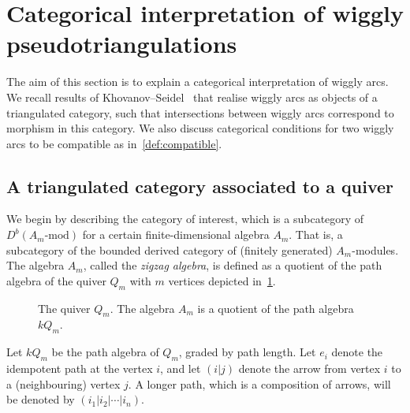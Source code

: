 \documentclass{amsart}
\theoremstyle{definition}
\begin{document}
\section{Categorical interpretation of wiggly pseudotriangulations}
The aim of this section is to explain a categorical interpretation of wiggly arcs.
We recall results of Khovanov--Seidel~\cite{kho.sei:02} that realise wiggly arcs as objects of a triangulated category, such that intersections between wiggly arcs correspond to morphism in this category.
We also discuss categorical conditions for two wiggly arcs to be compatible as in~\cref{def:compatible}.


\subsection{A triangulated category associated to a quiver}
We begin by describing the category of interest, which is a subcategory of \(D^b(A_m\text{-mod})\) for a certain finite-dimensional algebra \(A_m\).
That is, a subcategory of the bounded derived category of (finitely generated) \(A_m\)-modules.
The algebra \(A_m\), called the \emph{zigzag algebra}, is defined as a quotient of the path algebra of the quiver \(Q_m\) with \(m\) vertices depicted in~\cref{fig:am-quiver}.
\begin{figure}[h]
  \centering
  \caption{The quiver \(Q_m\). The algebra \(A_m\) is a quotient of the path algebra \(kQ_m\).}
  \label{fig:am-quiver}
\end{figure}
Let \(kQ_m\) be the path algebra of \(Q_m\), graded by path length.
Let \(e_i\) denote the idempotent path at the vertex \(i\), and let \((i|j)\) denote the arrow from vertex \(i\) to a (neighbouring) vertex \(j\).
A longer path, which is a composition of arrows, will be denoted by \((i_1|i_2|\cdots|i_n)\).
\end{document}

